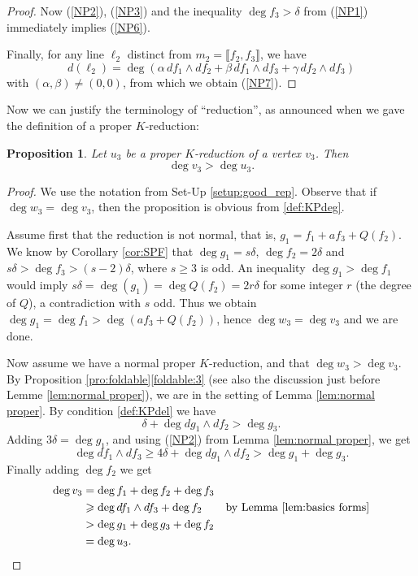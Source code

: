 \documentclass[reqno,oneside,11pt]{amsart}
\theoremstyle{plain}
\newtheorem{proposition}[theorem]{Proposition}
\theoremstyle{definition}
\newcommand{\llb}{\llbracket}
\newcommand{\rrb}{\rrbracket}
\renewcommand{\ge}{\geqslant}
\begin{document}
\begin{proof}
Now (\ref{NP2}), (\ref{NP3}) and the inequality $\deg f_3 > \delta$ from
(\ref{NP1}) immediately implies (\ref{NP6}).

Finally, for any line $\ell_2$ distinct from $m_2 = \llb f_2, f_3\rrb$, we have
$$d(\ell_2) = \deg (\alpha\, df_1 \wedge df_2 + \beta\, df_1 \wedge df_3
+\gamma\, df_2 \wedge df_3)$$
with $(\alpha, \beta) \neq (0,0)$, from which we obtain (\ref{NP7}).
\end{proof}

Now we can justify the terminology of ``reduction'', as announced when we gave the definition of a proper $K$-reduction:

\begin{proposition} \label{pro:K reduces degree}
Let $u_3$ be a proper $K$-reduction of a vertex $v_3$.
Then
$$\deg v_3 > \deg u_3.$$
\end{proposition}

\begin{proof}
We use the notation from Set-Up \ref{setup:good_rep}.
Observe that if $\deg w_3 = \deg v_3$, then the proposition is obvious from \ref{def:KPdeg}.

Assume first that the reduction is not normal, that is, $g_1 = f_1 + af_3 + Q(f_2)$.
We know by Corollary \ref{cor:SPF}
that $\deg g_1 = s\delta$, $\deg f_2 = 2\delta$ and $s\delta > \deg
f_3 > (s-2) \delta$, where $s \ge 3$ is odd.
An inequality $\deg g_1 > \deg f_1$ would imply $s\delta = \deg (g_1) = \deg
Q(f_2) = 2r\delta$ for some integer $r$ (the degree of $Q$), a contradiction
with $s$ odd.
Thus we obtain $\deg g_1 = \deg f_1 > \deg (af_3 +
Q(f_2))$, hence $\deg w_3 = \deg v_3$ and we are done.

Now assume we have a normal proper $K$-reduction, and that $\deg w_3 > \deg
v_3$.
By Proposition \ref{pro:foldable}\ref{foldable:3} (see also the discussion
just before Lemme \ref{lem:normal proper}), we are in the setting of Lemma
\ref{lem:normal proper}.
By condition \ref{def:KPdel} we have
$$\delta +  \deg dg_1 \wedge df_2 > \deg g_3 .$$
Adding $3\delta = \deg g_1$, and using (\ref{NP2}) from Lemma \ref{lem:normal proper}, we get
$$\deg df_1 \wedge df_3 \ge 4 \delta +  \deg dg_1 \wedge df_2 > \deg g_1 + \deg g_3.$$
Finally adding $\deg f_2$ we get
\begin{align*}
\deg v_3 &= \deg f_1 + \deg f_2 + \deg f_3 \\
&\ge \deg df_1 \wedge df_3 + \deg f_2 &\text{by Lemma \ref{lem:basics forms}}\\
&> \deg g_1  + \deg g_3 + \deg f_2 \\
&= \deg u_3.\qedhere
\end{align*}
\end{proof}
\end{document}
